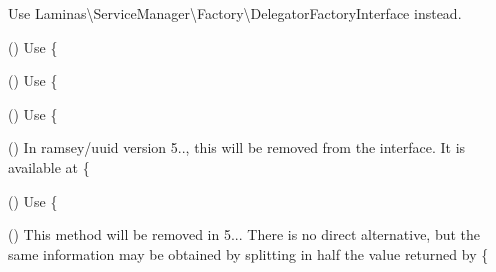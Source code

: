 \begin{DoxyRefList}
%
Use Laminas\textbackslash{}\+Service\+Manager\textbackslash{}\+Factory\textbackslash{}\+Delegator\+Factory\+Interface instead.  
\item[\doxylink{report_8contract_8php_a77b973d137fb33212e018b042df6e3e7}{Global(e)} \doxylink{interface_ramsey_1_1_uuid_1_1_deprecated_uuid_interface_a4064a5c9a6c20cfdc25d6dfc79aa4ea5}{Deprecated\+Uuid\+Interface\+::get\+Clock\+Seq\+Hi\+And\+Reserved\+Hex} ()]\label{deprecated__deprecated000115}%
%
Use \{ 
\item[\doxylink{report_8contract_8php_a77b973d137fb33212e018b042df6e3e7}{Global(e)} \doxylink{interface_ramsey_1_1_uuid_1_1_deprecated_uuid_interface_a8bbc61bf61b26dc4cb1c44deb306a95a}{Deprecated\+Uuid\+Interface\+::get\+Clock\+Seq\+Low\+Hex} ()]\label{deprecated__deprecated000116}%
%
Use \{ 
\item[\doxylink{report_8contract_8php_a77b973d137fb33212e018b042df6e3e7}{Global(e)} \doxylink{interface_ramsey_1_1_uuid_1_1_deprecated_uuid_interface_a1a7e4340050f5494cbbc3366977e3cf2}{Deprecated\+Uuid\+Interface\+::get\+Clock\+Sequence\+Hex} ()]\label{deprecated__deprecated000117}%
%
Use \{ 
\item[\doxylink{report_8contract_8php_a77b973d137fb33212e018b042df6e3e7}{Global(e)} \doxylink{interface_ramsey_1_1_uuid_1_1_deprecated_uuid_interface_a80943d6026bc56930ebcf017ffcafd33}{Deprecated\+Uuid\+Interface\+::get\+Date\+Time} ()]\label{deprecated__deprecated000118}%
%
In ramsey/uuid version 5.., this will be removed from the interface. It is available at \{ 
\item[\doxylink{report_8contract_8php_a77b973d137fb33212e018b042df6e3e7}{Global(e)} \doxylink{interface_ramsey_1_1_uuid_1_1_deprecated_uuid_interface_a0254b872eba5ed13abb62c8f544973f5}{Deprecated\+Uuid\+Interface\+::get\+Fields\+Hex} ()]\label{deprecated__deprecated000114}%
%
Use \{ 
\item[\doxylink{report_8contract_8php_a77b973d137fb33212e018b042df6e3e7}{Global(e)} \doxylink{interface_ramsey_1_1_uuid_1_1_deprecated_uuid_interface_a9377d7086b7368a4b421dc3f0b72a8f6}{Deprecated\+Uuid\+Interface\+::get\+Least\+Significant\+Bits\+Hex} ()]\label{deprecated__deprecated000119}%
%
This method will be removed in 5... There is no direct alternative, but the same information may be obtained by splitting in half the value returned by \{ 

\end{DoxyRefList}
